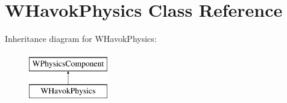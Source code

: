 \hypertarget{class_w_havok_physics}{}\section{W\+Havok\+Physics Class Reference}
\label{class_w_havok_physics}
Inheritance diagram for W\+Havok\+Physics\+:\begin{figure}[H]
\begin{center}
\leavevmode
\includegraphics[height=2.000000cm]{class_w_havok_physics}
\end{center}
\end{figure}
